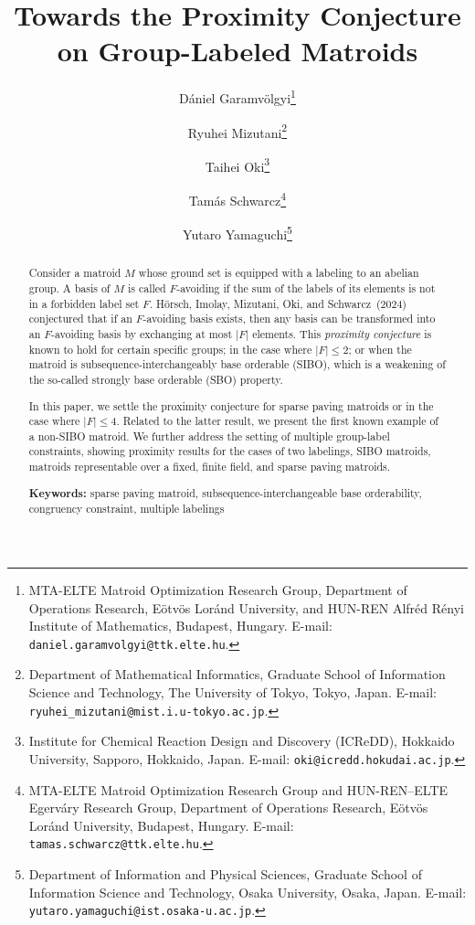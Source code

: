 \documentclass{article}
\theoremstyle{definition}
\begin{document}
\title{\texorpdfstring{Towards the Proximity Conjecture on Group-Labeled Matroids}{Towards the Proximity Conjecture on Group-Labeled Matroids}}
\author{
\hspace{5mm}
Dániel Garamvölgyi\thanks{MTA-ELTE Matroid Optimization Research Group, Department of Operations Research,
Eötvös Loránd University, and HUN-REN Alfréd Rényi Institute of Mathematics, Budapest, Hungary. E-mail: \texttt{daniel.garamvolgyi@ttk.elte.hu}.}
\hspace{5mm}
\and
Ryuhei Mizutani\thanks{Department of Mathematical Informatics, Graduate School of Information Science and Technology, The University of Tokyo, Tokyo, Japan. E-mail: \texttt{ryuhei\_mizutani@mist.i.u-tokyo.ac.jp}.}
\hspace{5mm}
\and
Taihei Oki\thanks{Institute for Chemical Reaction Design and Discovery (ICReDD), Hokkaido University, Sapporo, Hokkaido, Japan. E-mail: \texttt{oki@icredd.hokudai.ac.jp}.}
\hspace{5mm}
\and
Tamás Schwarcz\thanks{MTA-ELTE Matroid Optimization Research Group and HUN-REN–ELTE Egerváry Research Group, Department of
Operations Research, Eötvös Loránd University, Budapest, Hungary. E-mail: \texttt{tamas.schwarcz@ttk.elte.hu}.}
\and 
Yutaro Yamaguchi\thanks{Department of Information and Physical Sciences, Graduate School of Information Science and Technology, Osaka University, Osaka, Japan. E-mail: \texttt{yutaro.yamaguchi@ist.osaka-u.ac.jp}.}
}
\date{}

\maketitle

\begin{abstract}
    Consider a matroid $M$ whose ground set is equipped with a labeling to an abelian group.
    A basis of $M$ is called $F$-avoiding if the sum of the labels of its elements is not in a forbidden label set $F$.
    Hörsch, Imolay, Mizutani, Oki, and Schwarcz~(2024)
    conjectured that if an $F$-avoiding basis exists, then any basis can be transformed into an $F$-avoiding basis by exchanging at most $|F|$ elements.
    This \emph{proximity conjecture} is known to hold for certain specific groups; in the case where $|F| \le 2$; or when the matroid is subsequence-interchangeably base orderable (SIBO), which is a weakening of the so-called strongly base orderable (SBO) property.
    
    In this paper, we settle the proximity conjecture for sparse paving matroids or in the case where $|F| \le 4$.
    Related to the latter result, we present the first known example of a non-SIBO matroid.
    We further address the setting of multiple group-label constraints, showing proximity results for the cases of two labelings, SIBO matroids, matroids representable over a fixed, finite field, and sparse paving matroids.

\medskip

\noindent \textbf{Keywords:}
    sparse paving matroid, subsequence-interchangeable base orderability, congruency constraint, multiple labelings

\end{abstract}
\end{document}
